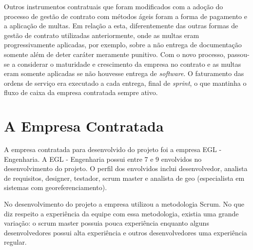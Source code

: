 Outros instrumentos contratuais que foram modificados com a adoção do processo de gestão de contrato com métodos ágeis foram a forma de pagamento e a aplicação de multas. Em relação a esta, diferentemente das outras formas de gestão de contrato utilizadas anteriormente, onde as multas eram progressivamente aplicadas, por exemplo, sobre a não entrega de documentação somente além de deter caráter meramente punitivo. Com o novo processo, passou-se a considerar o maturidade e crescimento da empresa no contrato e as multas eram somente aplicadas se não houvesse entrega de \textit{software}. O faturamento das ordens de serviço era executado a cada entrega, final de \textit{sprint}, o que mantinha o fluxo de caixa da empresa contratada sempre ativo. 


\section[A Empresa Contratada]{A Empresa Contratada}

A empresa contratada para desenvolvido do projeto foi a empresa EGL - Engenharia. A EGL - Engenharia possui entre 7 e 9 envolvidos no desenvolvimento do projeto. O perfil dos envolvidos inclui desenvolvedor, analista de requisitos, designer, testador, scrum master e analista de geo (especialista em sistemas com georeferenciamento).

No desenvolvimento do projeto a empresa utilizou a metodologia Scrum. No que diz respeito a experiência da equipe com essa metodologia, existia uma grande variação: o scrum master possuia pouca experiência enquanto alguns desenvolvedores possui alta experiência e outros desenvolvedores uma experiência regular.

